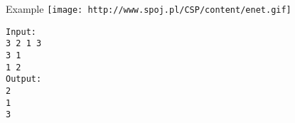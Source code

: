 Example
\texttt{[image: http://www.spoj.pl/CSP/content/enet.gif]}
\begin{verbatim}
Input:
3 2 1 3
3 1
1 2
Output:
2
1
3
\end{verbatim}